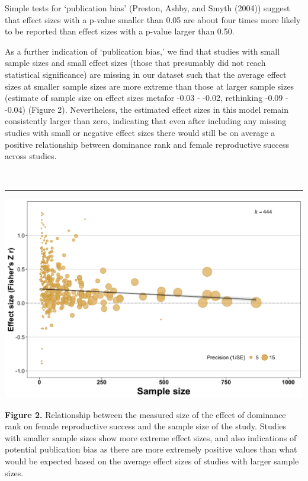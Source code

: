 \documentclass[
]{article}
\begin{document}
Simple tests for `publication bias' (Preston, Ashby, and Smyth (2004))
suggest that effect sizes with a p-value smaller than 0.05 are about
four times more likely to be reported than effect sizes with a p-value
larger than 0.50.

As a further indication of `publication bias,' we find that studies with
small sample sizes and small effect sizes (those that presumably did not
reach statistical significance) are missing in our dataset such that the
average effect sizes at smaller sample sizes are more extreme than those
at larger sample sizes (estimate of sample size on effect sizes metafor
-0.03 - -0.02, rethinking -0.09 - -0.04) (Figure 2). Nevertheless, the
estimated effect sizes in this model remain consistently larger than
zero, indicating that even after including any missing studies with
small or negative effect sizes there would still be on average a
positive relationship between dominance rank and female reproductive
success across studies.

~

\begin{center}\rule{0.5\linewidth}{0.5pt}\end{center}

\includegraphics{ranksuccess_Fig2_effectsize_samplesize.png}

\textbf{Figure 2.} Relationship between the measured size of the effect
of dominance rank on female reproductive success and the sample size of
the study. Studies with smaller sample sizes show more extreme effect
sizes, and also indications of potential publication bias as there are
more extremely positive values than what would be expected based on the
average effect sizes of studies with larger sample sizes.
\end{document}
